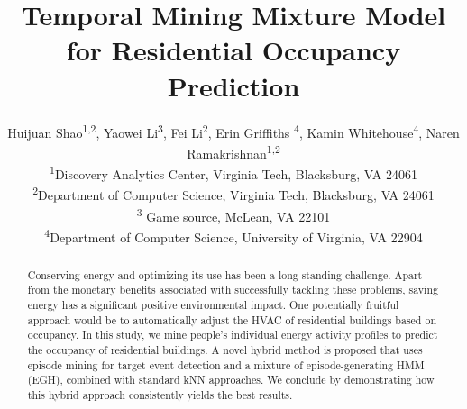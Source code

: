 \documentclass[sigconf]{acmart}
\begin{document}
\title{Temporal Mining Mixture Model for
Residential Occupancy Prediction}

\author{
  Huijuan Shao\textsuperscript{1,2}, Yaowei Li\textsuperscript{3}, Fei Li\textsuperscript{2}, Erin Griffiths \textsuperscript{4}, Kamin Whitehouse\textsuperscript{4}, Naren Ramakrishnan\textsuperscript{1,2} \\
  \textsuperscript{1}Discovery Analytics Center, Virginia Tech, Blacksburg, VA 24061 \\ %
  \textsuperscript{2}Department of Computer Science, Virginia Tech, Blacksburg, VA 24061 \\ %
    \textsuperscript{3} Game source, McLean, VA 22101 \\
  \textsuperscript{4}Department of Computer Science, University of Virginia, VA 22904 \\ %
}




\renewcommand{\shortauthors}{H. Shao et al.}


\begin{abstract}
Conserving energy and optimizing its use has been a long standing challenge. 
Apart from the monetary benefits associated with successfully tackling these problems, saving energy has a significant positive environmental impact. 
One potentially fruitful approach would be to automatically adjust the HVAC of residential buildings based on occupancy.
In this study, we mine people's individual energy activity profiles to predict the occupancy of residential buildings. A novel hybrid method is proposed that uses episode mining for target event  detection and a mixture of episode-generating HMM (EGH), 
combined with standard kNN approaches. We conclude by demonstrating how this hybrid approach consistently yields the best results.
\end{abstract}

%
%


\end{document}
